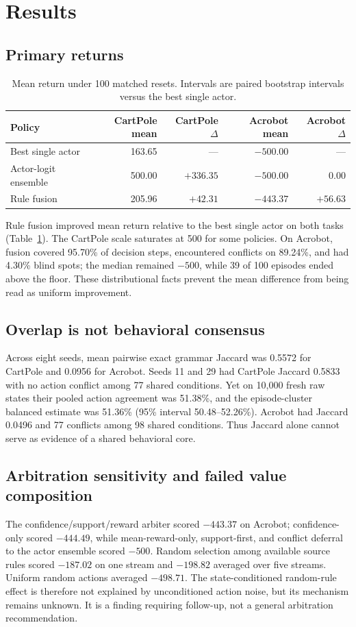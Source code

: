 \documentclass[11pt,a4paper]{article}
\begin{document}
\section{Results}
\label{sec:results}

\subsection{Primary returns}
\begin{table}[t]
\centering
\caption{Mean return under 100 matched resets. Intervals are paired bootstrap intervals versus the best single actor.}
\label{tab:returns}
\small
\begin{tabular}{@{}lrrrr@{}}
\toprule
Policy & CartPole mean & CartPole $\Delta$ & Acrobot mean & Acrobot $\Delta$ \\
\midrule
Best single actor & 163.65 & --- & $-500.00$ & --- \\
Actor-logit ensemble & 500.00 & $+336.35$ & $-500.00$ & $0.00$ \\
Rule fusion & 205.96 & $+42.31$ & $-443.37$ & $+56.63$ \\
\bottomrule
\end{tabular}
\end{table}

Rule fusion improved mean return relative to the best single actor on both tasks (Table~\ref{tab:returns}). The CartPole scale saturates at 500 for some policies. On Acrobot, fusion covered 95.70\% of decision steps, encountered conflicts on 89.24\%, and had 4.30\% blind spots; the median remained $-500$, while 39 of 100 episodes ended above the floor. These distributional facts prevent the mean difference from being read as uniform improvement.

\subsection{Overlap is not behavioral consensus}
Across eight seeds, mean pairwise exact grammar Jaccard was 0.5572 for CartPole and 0.0956 for Acrobot. Seeds 11 and 29 had CartPole Jaccard 0.5833 with no action conflict among 77 shared conditions. Yet on 10,000 fresh raw states their pooled action agreement was 51.38\%, and the episode-cluster balanced estimate was 51.36\% (95\% interval 50.48--52.26\%). Acrobot had Jaccard 0.0496 and 77 conflicts among 98 shared conditions. Thus Jaccard alone cannot serve as evidence of a shared behavioral core.

\subsection{Arbitration sensitivity and failed value composition}
The confidence/support/reward arbiter scored $-443.37$ on Acrobot; confidence-only scored $-444.49$, while mean-reward-only, support-first, and conflict deferral to the actor ensemble scored $-500$. Random selection among available source rules scored $-187.02$ on one stream and $-198.82$ averaged over five streams. Uniform random actions averaged $-498.71$. The state-conditioned random-rule effect is therefore not explained by unconditioned action noise, but its mechanism remains unknown. It is a finding requiring follow-up, not a general arbitration recommendation.
\end{document}
